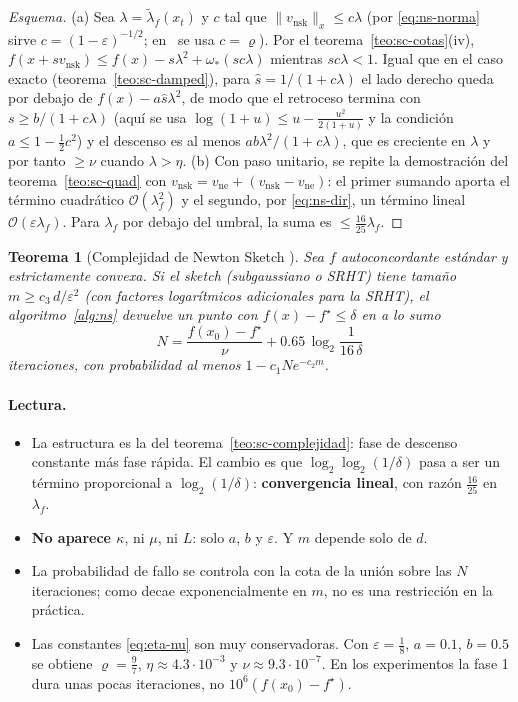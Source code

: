 \documentclass[11pt,a4paper,oneside]{book}
\newtheorem{teorema}{Teorema}[chapter]
\theoremstyle{definition}
\theoremstyle{remark}
\newcommand{\cO}{\mathcal{O}}
\newcommand{\eps}{\varepsilon}
\newcommand{\nrm}[1]{\lVert #1\rVert}
\newcommand{\lamf}{\lambda_f}
\newcommand{\lamt}{\widetilde{\lambda}_f}
\newcommand{\vne}{v_{\mathrm{ne}}}
\newcommand{\vnsk}{v_{\mathrm{nsk}}}
\begin{document}
\begin{proof}[Esquema]
(a) Sea $\lambda=\lamt(x_t)$ y $c$ tal que $\nrm{\vnsk}_x\le c\lambda$ (por \eqref{eq:ns-norma} sirve
$c=(1-\eps)^{-1/2}$; en~\cite{PW17} se usa $c=\varrho$). Por el teorema~\ref{teo:sc-cotas}(iv),
$f(x+s\vnsk)\le f(x)-s\lambda^2+\omega_*(sc\lambda)$ mientras $sc\lambda<1$. Igual que en el caso exacto
(teorema~\ref{teo:sc-damped}), para $\hat s=1/(1+c\lambda)$ el lado derecho queda por debajo de $f(x)-a\hat s\lambda^2$, de
modo que el retroceso termina con $s\ge b/(1+c\lambda)$ (aquí se usa $\log(1+u)\le u-\frac{u^2}{2(1+u)}$ y la condición $a\le1-\frac12c^2$) y el descenso es al menos $ab\lambda^2/(1+c\lambda)$, que es creciente
en $\lambda$ y por tanto $\ge\nu$ cuando $\lambda>\eta$.
(b) Con paso unitario, se repite la demostración del teorema~\ref{teo:sc-quad} con $\vnsk=\vne+(\vnsk-\vne)$: el
primer sumando aporta el término cuadrático $\cO(\lamf^2)$ y el segundo, por \eqref{eq:ns-dir}, un término lineal
$\cO(\eps\lamf)$. Para $\lamf$ por debajo del umbral, la suma es $\le\frac{16}{25}\lamf$.
\end{proof}

\begin{teorema}[Complejidad de Newton Sketch {\cite[Teorema~2]{PW17}}]\label{teo:pw2}
Sea $f$ autoconcordante estándar y estrictamente convexa. Si el \emph{sketch} (subgaussiano o SRHT) tiene tamaño
$m\ge c_3\,d/\eps^2$ (con factores logarítmicos adicionales para la SRHT), el algoritmo~\ref{alg:ns} devuelve un punto con
$f(x)-f^\star\le\delta$ en a lo sumo
\[ N=\frac{f(x_0)-f^\star}{\nu}+0.65\,\log_2\frac{1}{16\,\delta} \]
iteraciones, con probabilidad al menos $1-c_1Ne^{-c_2m}$.
\end{teorema}

\paragraph{Lectura.}
\begin{itemize}
  \item La estructura es la del teorema~\ref{teo:sc-complejidad}: fase de descenso constante más fase rápida. El
        cambio es que $\log_2\log_2(1/\delta)$ pasa a ser un término proporcional a $\log_2(1/\delta)$:
        \textbf{convergencia lineal}, con razón $\frac{16}{25}$ en $\lamf$.
  \item \textbf{No aparece $\kappa$}, ni $\mu$, ni $L$: solo $a$, $b$ y $\eps$. Y $m$ depende solo de $d$.
  \item La probabilidad de fallo se controla con la cota de la unión sobre las $N$ iteraciones; como decae
        exponencialmente en $m$, no es una restricción en la práctica.
  \item Las constantes \eqref{eq:eta-nu} son muy conservadoras. Con $\eps=\tfrac18$, $a=0.1$, $b=0.5$ se obtiene
        $\varrho=\tfrac97$, $\eta\approx4.3\cdot10^{-3}$ y $\nu\approx9.3\cdot10^{-7}$. En los experimentos la fase 1 dura
        unas pocas iteraciones, no $10^6(f(x_0)-f^\star)$.
\end{itemize}
\end{document}
